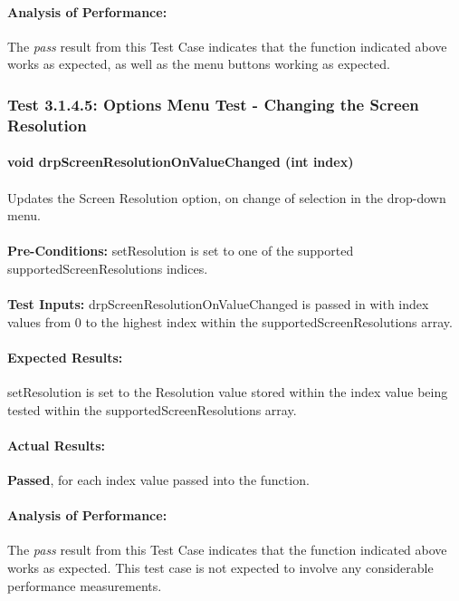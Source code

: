 \documentclass{article}
\begin{document}
    \paragraph{Analysis of Performance:} The \emph{pass} result from this Test Case indicates that the function indicated above works as expected, as well as the menu buttons working as expected.
    
    \subsubsection{Test 3.1.4.5: Options Menu Test - Changing the Screen Resolution}
    \paragraph{}\textbf{void drpScreenResolutionOnValueChanged (int index)}
    \paragraph{} Updates the Screen Resolution option, on change of selection in the drop-down menu.
    \paragraph{}\textbf{Pre-Conditions:} setResolution is set to one of the supported supportedScreenResolutions indices.
    \paragraph{}\textbf{Test Inputs:} drpScreenResolutionOnValueChanged is passed in with index values from 0 to the highest index within the supportedScreenResolutions array.
    \paragraph{Expected Results:} setResolution is set to the Resolution value stored within the index value being tested within the supportedScreenResolutions array.
    \paragraph{Actual Results:} \textbf{Passed}, for each index value passed into the function.
    \paragraph{Analysis of Performance:} The \emph{pass} result from this Test Case indicates that the function indicated above works as expected. This test case is not expected to involve any considerable performance measurements.   
    
\end{document}
